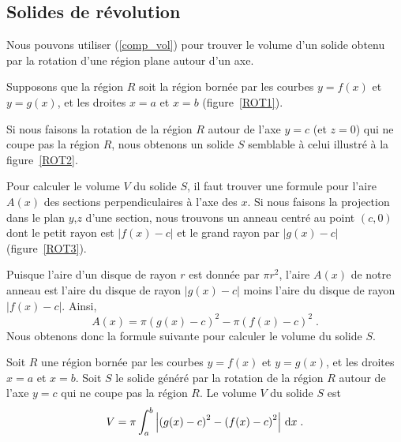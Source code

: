 {\subsection{Solides de révolution}

Nous pouvons utiliser (\ref{comp_vol}) pour trouver le volume d'un solide obtenu
par la rotation d'une région plane autour d'un axe.


Supposons que la région $R$ soit la région bornée par les courbes $y=f(x)$ et
$y=g(x)$, et les droites $x=a$ et $x=b$ (figure~\ref{ROT1}).


Si nous faisons la rotation de la région $R$ autour de l'axe $y=c$ (et
$z=0$) qui ne coupe pas la région $R$, nous obtenons un solide $S$
semblable à celui illustré à la figure~\ref{ROT2}.


Pour calculer le volume $V$ du solide $S$, il faut trouver une formule pour
l'aire $A(x)$ des sections perpendiculaires à l'axe des $x$.  Si nous
faisons la projection dans le plan $y$,$z$ d'une section, nous trouvons un
anneau centré au point $(c,0)$ dont le petit rayon est $|f(x)-c|$ et
le grand rayon par $|g(x)-c|$ (figure~\ref{ROT3}).

Puisque l'aire d'un disque de rayon $r$ est donnée par $\pi r^2$,
l'aire $A(x)$ de notre anneau est l'aire du disque de rayon $|g(x)-c|$
moins l'aire du disque de rayon $|f(x)-c|$.  Ainsi,
\[
A(x) = \pi\left(g(x)-c\right)^2 - \pi\left(f(x)-c\right)^2 \; .
\]
Nous obtenons donc la formule suivante pour calculer le volume du solide $S$.

\begin{meth}
Soit $R$ une région bornée par les courbes $y=f(x)$ et $y=g(x)$, et les
droites $x=a$ et $x=b$.  Soit $S$ le solide généré par la rotation de la
région $R$ autour de l'axe $y=c$ qui ne coupe pas la région $R$.  Le volume
$V$ du solide $S$ est
\begin{equation}\label{vol_washer}
V = \pi \int_a^b \left|\left(g(x)-c\right)^2 -
  \left(f(x)-c\right)^2\right| \,\mathrm{d}x \; .
\end{equation}
\end{meth}

}
